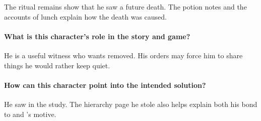 {{The ritual remains show that he saw a future death. The potion notes and the accounts of lunch explain how the death was caused.

\paragraph{What is this character's role in the story and game?}

He is a useful witness who wants  removed. His orders may force him to share things he would rather keep quiet.

\paragraph{How can this character point into the intended solution?}

He saw  in the study. The hierarchy page he stole also helps explain both his bond to  and 's motive.

}

}
